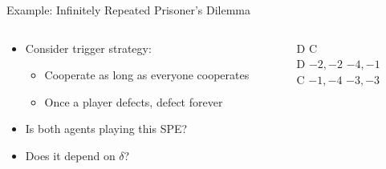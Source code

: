 \documentclass[11pt,aspectratio=169,handout]{beamer}
\begin{document}
  \begin{frame}{Example: Infinitely Repeated Prisoner's Dilemma} 
   \begin{columns}
    \begin{column}{0.7\textwidth}
     \begin{itemize}[<+->]
     \setlength{\itemsep}{1.2em}
      \item Consider \alert{trigger} strategy:
      \begin{itemize}[<.->]
       \item Cooperate as long as everyone cooperates
       \item Once a player defects, defect \alert{forever}
      \end{itemize}
      \item Is both agents playing this SPE?
      \item Does it depend on $\delta$?
     \end{itemize}
    \end{column}
    \begin{column}{0.3\textwidth}
     \begin{center}
      \begin{game}{2}{2}
      		\> D			\> C			\\
       D		\> $-2,-2$	\> $-4,-1$	\\
       C		\> $-1,-4$	\> $-3,-3$
      \end{game}
     \end{center}
    \end{column}
   \end{columns}
  \end{frame}
  
\end{document}
